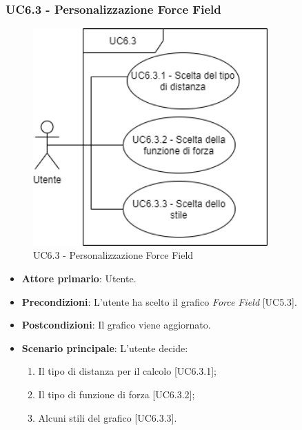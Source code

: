 \subsubsection{UC6.3 - Personalizzazione Force Field}
\begin{figure}[h]
\includegraphics[width=9cm]{section/Images/UC6.3.png}
\centering
\caption{UC6.3 - Personalizzazione Force Field}
\end{figure}
\begin{itemize}
	\item \textbf{Attore primario}: Utente.
	
	\item \textbf{Precondizioni}: L'utente ha scelto il grafico \textit{Force Field} [UC5.3].
	
	\item \textbf{Postcondizioni}: Il grafico viene aggiornato.
	
	\item \textbf{Scenario principale}: L'utente decide:
	
\begin{enumerate}
\item Il tipo di distanza per il calcolo [UC6.3.1];
\item Il tipo di funzione di forza [UC6.3.2];
\item Alcuni stili del grafico [UC6.3.3].
\end{enumerate}	
		
\end{itemize}

